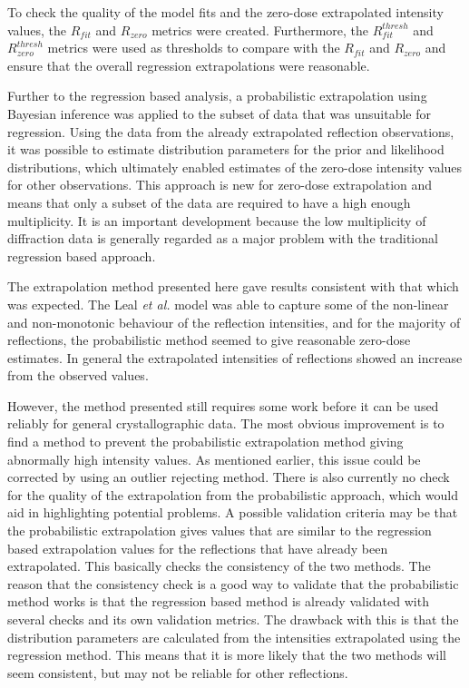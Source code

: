 To check the quality of the model fits and the zero-dose extrapolated intensity values, the $R_{fit}$ and $R_{zero}$ metrics were created.
Furthermore, the $R^{thresh}_{fit}$ and $R^{thresh}_{zero}$ metrics were used as thresholds to compare with the $R_{fit}$ and $R_{zero}$ and ensure that the overall regression extrapolations were reasonable.

Further to the regression based analysis, a probabilistic extrapolation using Bayesian inference was applied to the subset of data that was unsuitable for regression.
Using the data from the already extrapolated reflection observations, it was possible to estimate distribution parameters for the prior and likelihood distributions, which ultimately enabled estimates of the zero-dose intensity values for other observations.
This approach is new for zero-dose extrapolation and means that only a subset of the data are required to have a high enough multiplicity.
It is an important development because the low multiplicity of diffraction data is generally regarded as a major problem with the traditional regression based approach.

The extrapolation method presented here gave results consistent with that which was expected.
The Leal \textit{et al.} model was able to capture some of the non-linear and non-monotonic behaviour of the reflection intensities, and for the majority of reflections, the probabilistic method seemed to give reasonable zero-dose estimates.
In general the extrapolated intensities of reflections showed an increase from the observed values.

However, the method presented still requires some work before it can be used reliably for general crystallographic data.
The most obvious improvement is to find a method to prevent the probabilistic extrapolation method giving abnormally high intensity values.
As mentioned earlier, this issue could be corrected by using an outlier rejecting method.
There is also currently no check for the quality of the extrapolation from the probabilistic approach, which would aid in highlighting potential problems.
A possible validation criteria may be that the probabilistic extrapolation gives values that are similar to the regression based extrapolation values for the reflections that have already been extrapolated.
This basically checks the consistency of the two methods.
The reason that the consistency check is a good way to validate that the probabilistic method works is that the regression based method is already validated with several checks and its own validation metrics.
The drawback with this is that the distribution parameters are calculated from the intensities extrapolated using the regression method.
This means that it is more likely that the two methods will seem consistent, but may not be reliable for other reflections.

